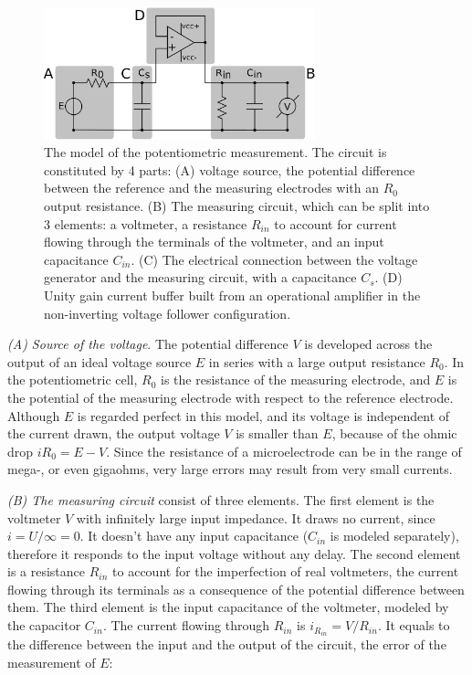 \begin{figure}
\centering
\includegraphics[width=0.7\textwidth]{img/theory/loading_error_2.eps}
\caption[The model of the potentiometric measurement.]{The model of the potentiometric measurement. The circuit is constituted by 4 parts: (A) voltage source, the potential difference between the reference and the measuring electrodes with an $R_0$ output resistance. (B) The measuring circuit, which can be split into 3 elements: a voltmeter, a resistance $R_{in}$ to account for current flowing through the terminals of the voltmeter, and an input capacitance $C_{in}$. (C) The electrical connection between the voltage generator and the measuring circuit, with a capacitance $C_s$. (D) Unity gain current buffer built from an operational amplifier in the non-inverting voltage follower configuration.}
\label{fig:loading_error}
\end{figure}

\emph{(A) Source of the voltage}.
The potential difference $V$ is developed across the output of an ideal voltage source $E$ in series with a large output resistance $R_0$.
In the potentiometric cell, $R_0$ is the resistance of the measuring electrode, and $E$ is the potential of the measuring electrode with respect to the reference electrode.
Although $E$ is regarded perfect in this model, and its voltage is independent of the current drawn, the output voltage $V$ is smaller than $E$, because of the ohmic drop $iR_0 = E - V$.
Since the resistance of a microelectrode can be in the range of mega-, or even gigaohms, very large errors may result from very small currents.

\emph{(B) The measuring circuit} consist of three elements.
The first element is the voltmeter $V$ with infinitely large input impedance. It draws no current, since $i = U/\infty=0$. It doesn't have any input capacitance ($C_{in}$ is modeled separately), therefore it responds to the input voltage without any delay.
The second element is a resistance $R_{in}$ to account for the imperfection of real voltmeters, the current flowing through its terminals as a consequence of the potential difference between them.
The third element is the input capacitance of the voltmeter, modeled by the capacitor $C_{in}$.
The current flowing through $R_{in}$ is $i_{R_{in}}=V/R_{in}$. It equals to the difference between the input and the output of the circuit, the error of the measurement of $E$:

